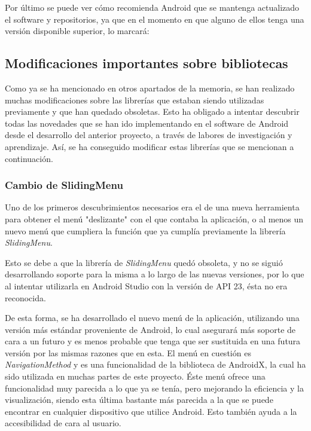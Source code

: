 Por último se puede ver cómo recomienda Android que se mantenga actualizado el software y repositorios, ya que en el momento en que alguno de ellos tenga una versión disponible superior, lo marcará:


\subsection{Modificaciones importantes sobre bibliotecas}

Como ya se ha mencionado en otros apartados de la memoria, se han realizado muchas modificaciones sobre las librerías que estaban siendo utilizadas previamente y que han quedado obsoletas. Esto ha obligado a intentar descubrir todas las novedades que se han ido implementando en el software de Android desde el desarrollo del anterior proyecto, a través de labores de investigación y aprendizaje. Así, se ha conseguido modificar estas librerías que se mencionan a continuación.

\subsubsection{Cambio de SlidingMenu}

Uno de los primeros descubrimientos necesarios era el de una nueva herramienta para obtener el menú "deslizante" con el que contaba la aplicación, o al menos un nuevo menú que cumpliera la función que ya cumplía previamente la librería \textit{SlidingMenu}.

Esto se debe a que la librería de \textit{SlidingMenu} quedó obsoleta, y no se siguió desarrollando soporte para la misma a lo largo de las nuevas versiones, por lo que al intentar utilizarla en Android Studio con la versión de API 23, ésta no era reconocida.

De esta forma, se ha desarrollado el nuevo menú de la aplicación, utilizando una versión más estándar proveniente de Android, lo cual asegurará más soporte de cara a un futuro y es menos probable que tenga que ser sustituida en una futura versión por las mismas razones que en esta. El menú en cuestión es \textit{NavigationMethod} y es una funcionalidad de la biblioteca de AndroidX, la cual ha sido utilizada en muchas partes de este proyecto. Éste menú ofrece una funcionalidad muy parecida a lo que ya se tenía, pero mejorando la eficiencia y la visualización, siendo esta última bastante más parecida a la que se puede encontrar en cualquier dispositivo que utilice Android. Esto también ayuda a la accesibilidad de cara al usuario.

